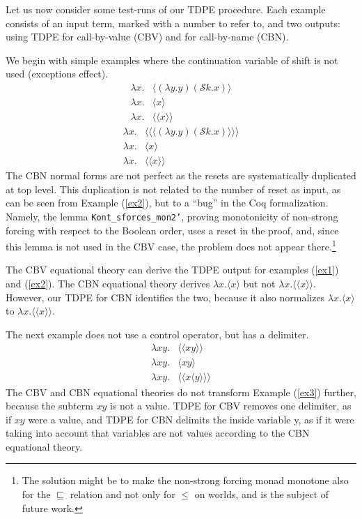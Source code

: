 \documentclass{eptcs}
\newcommand{\ureset}[1]{\langle{#1}\rangle}
\newcommand{\ushift}[2]{\mathcal{S}{#1}.{#2}}
\theoremstyle{definition}
\theoremstyle{plain}
\theoremstyle{remark}
\begin{document}
Let us now consider some test-runs of our TDPE procedure. Each example consists of an input term, marked with a number to refer to, and two outputs: using TDPE for call-by-value (CBV) and for call-by-name (CBN).

We begin with simple examples where the continuation variable of shift is not used (exceptions effect).
\begin{align}
\lambda x.& \ureset{(\lambda y.y)(\ushift{k}{x})}\label{ex1}\\
\lambda x.& \ureset{x} \tag{CBV}\\
\lambda x.& \ureset{\ureset{x}} \tag{CBN}
\end{align}
\begin{align}
\lambda x.& \ureset{\ureset{\ureset{(\lambda y.y)(\ushift{k}{x})}}}\label{ex2}\\
\lambda x.& \ureset{x} \tag{CBV}\\
\lambda x.& \ureset{\ureset{x}} \tag{CBN}
\end{align}
The CBN normal forms are not perfect as the resets are systematically duplicated at top level. This duplication is not related to the number of reset as input, as can be seen from Example (\ref{ex2}), but to a ``bug'' in the Coq formalization. Namely, the lemma \texttt{Kont\_sforces\_mon2'}, proving monotonicity of non-strong forcing with respect to the Boolean order, uses a reset in the proof, and, since this lemma is not used in the CBV case, the problem does not appear there.\footnote{The solution might be to make the non-strong forcing monad monotone also for the $\sqsubseteq$ relation and not only for $\leq$ on worlds, and is the subject of future work.}

The CBV equational theory can derive the TDPE output for examples (\ref{ex1}) and (\ref{ex2}). The CBN equational theory derives $\lambda x.\ureset{x}$ but not $\lambda x.\ureset{\ureset{x}}$. However, our TDPE for CBN identifies the two, because it also normalizes $\lambda x.\ureset{x}$ to $\lambda x.\ureset{\ureset{x}}$.

The next example does not use a control operator, but has a delimiter.
\begin{align}
\lambda x y.& \ureset{\ureset{x y}}\label{ex3}\\
\lambda x y.& {\ureset{x y}} \tag{CBV}\\
\lambda x y.& \ureset{\ureset{x \ureset{y}}} \tag{CBN}
\end{align}
The CBV and CBN equational theories do not transform Example (\ref{ex3}) further, because the subterm $x y$ is not a value. TDPE for CBV removes one delimiter, as if $x y$ were a value, and TDPE for CBN delimits the inside variable y, as if it were taking into account that variables are not values according to the CBN equational theory.
\end{document}

